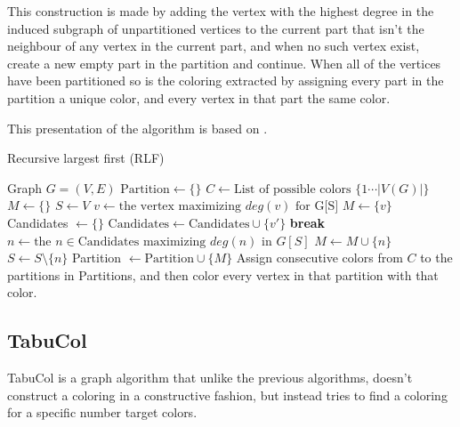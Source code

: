 \documentclass{amsart}
\newcommand{\algorithmicbreak}{\textbf{break}}
\newcommand{\BREAK}{\STATE \algorithmicbreak}
\begin{document}
This construction is made by adding the vertex with the highest degree in the
induced subgraph of unpartitioned vertices to the current part that
isn't the neighbour of any vertex in the current part, and when no
such vertex exist, create a new empty part in the partition and continue. When
all of the vertices have been partitioned so is the coloring extracted by
assigning every part in the partition a unique color, and every vertex in that
part the same color.

This presentation of the algorithm is based on \cite{Constructive}.
\begin{algorithm}[H]
    \caption{Recursive largest first (RLF)}
  \begin{algorithmic}[1]
      \REQUIRE Graph $G = (V,E)$
      \STATE $\text{Partition} \leftarrow \{\}$
      \STATE $C \leftarrow \text{List of possible colors $\{1 \cdots |V(G)| \}$ }$
      \STATE $M \leftarrow \{\}$
      \STATE $S \leftarrow V$
        \STATE $v \leftarrow \text{the vertex maximizing $deg(v)$ for G[S]} $
        \STATE $M \leftarrow \{v\}$
            \STATE Candidates $\leftarrow \{\}$
                    \STATE $\text{Candidates} \leftarrow \text{Candidates}
                    \cup \{v'\}$
                \ENDIF
            \ENDFOR
                \BREAK
            \ENDIF
            \STATE $n \leftarrow \text{the $n \in \text{Candidates}$ maximizing $deg(n)$ in $G[S]$}$ 
            \STATE $M \leftarrow M \cup \{n\}$
            \STATE $S \leftarrow S \setminus \{n\}$
        \ENDWHILE
        \STATE Partition $\leftarrow \text{Partition} \cup \{M\}$ 
      \ENDWHILE
      \STATE Assign consecutive colors from $C$ to the partitions in Partitions,
      and then color every vertex in that partition with that color.
  \end{algorithmic}
\end{algorithm}

\subsection{TabuCol}

TabuCol is a graph algorithm that unlike the previous algorithms, doesn't
construct a coloring in a constructive fashion, but instead tries to find a
coloring for a specific number target colors.
\end{document}
